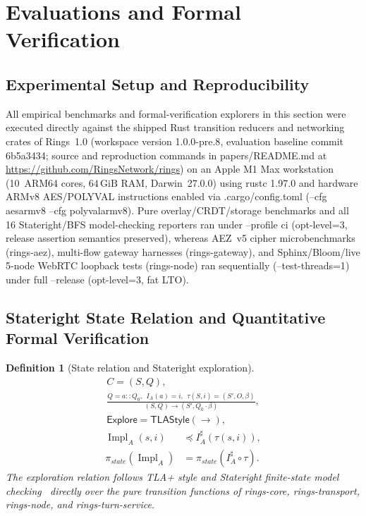 \documentclass[journal]{IEEEtran}
\newtheorem{definition}{Definition}
\DeclareRobustCommand{\code}[1]{{\ttfamily\renewcommand{\_}{\textunderscore\allowbreak}#1}}
\begin{document}
\section{Evaluations and Formal Verification}\label{sec:verification}

\subsection{Experimental Setup and Reproducibility}\label{sec:eval-setup}

All empirical benchmarks and formal-verification explorers in this section were executed directly against the shipped Rust transition reducers and networking crates of Rings~1.0 (workspace version \code{1.0.0-pre.8}, evaluation baseline commit \code{6b5a3434}; source and reproduction commands in \code{papers/README.md} at \url{https://github.com/RingsNetwork/rings}) on an Apple M1 Max workstation (10~ARM64 cores, $64\,\text{GiB}$ RAM, Darwin~27.0.0) using \code{rustc 1.97.0} and hardware ARMv8 AES/POLYVAL instructions enabled via \code{.cargo/config.toml} (\code{--cfg aes\_armv8 --cfg polyval\_armv8}). Pure overlay/CRDT/storage benchmarks and all 16 Stateright/BFS model-checking reporters ran under \code{--profile ci} (\code{opt-level=3}, release assertion semantics preserved), whereas AEZ~v5 cipher microbenchmarks (\code{rings-aez}), multi-flow gateway harnesses (\code{rings-gateway}), and Sphinx/Bloom/live 5-node WebRTC loopback tests (\code{rings-node}) ran sequentially (\code{--test-threads=1}) under full \code{--release} (\code{opt-level=3}, fat LTO).

\subsection{Stateright State Relation and Quantitative Formal Verification}

\begin{definition}[State relation and Stateright exploration]
\[
\begin{gathered}
  C=(S,Q),\\
  \frac{
    Q=a::Q_0,\ \ I_A(a)=i,\ \ \tau(S,i)=(S',O,\beta)
  }{
    (S,Q)\to(S',Q_0\cdot\beta)
  },\\
  \mathsf{Explore}=\mathsf{TLAStyle}(\to),
\end{gathered}
\]
\[
\begin{aligned}
  \operatorname{Impl}_A(s,i) &\preceq I_A^\sharp(\tau(s,i)),\\
  \pi_{state}(\operatorname{Impl}_A) &= \pi_{state}(I_A^\sharp\circ\tau).
\end{aligned}
\]
The exploration relation follows TLA+ style and Stateright finite-state model checking~\cite{LamportSpecifyingSystems,Stateright} directly over the pure transition functions of \code{rings-core}, \code{rings-transport}, \code{rings-node}, and \code{rings-turn-service}.
\end{definition}
\end{document}
